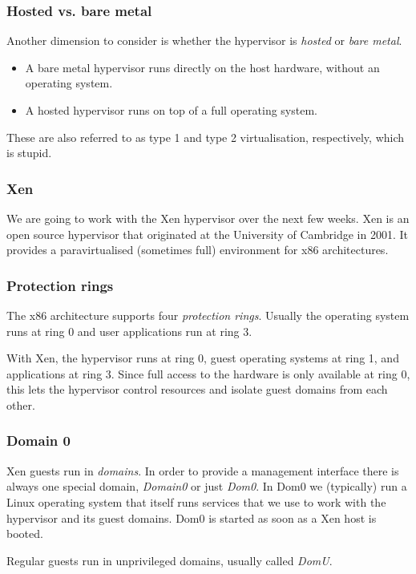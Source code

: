 \documentclass[10pt]{beamer}
\begin{document}
\begin{frame}
  \frametitle{Hosted vs. bare metal}
  
  Another dimension to consider is whether the hypervisor is \emph{hosted} or \emph{bare metal}.
  
  \begin{itemize}
    \item A bare metal hypervisor runs directly on the host hardware, without an operating system.
    \item A hosted hypervisor runs on top of a full operating system.
    \end{itemize}
    
    These are also referred to as type 1 and type 2 virtualisation, respectively, which is stupid.
   
\end{frame}
   
\begin{frame}
  \frametitle{Xen}
   
   We are going to work with the Xen hypervisor over the next few weeks. Xen is an open source hypervisor that originated at the University of Cambridge in 2001. 
   It provides a paravirtualised (sometimes full) environment for x86 architectures.
     
\end{frame}

\begin{frame}
  \frametitle{Protection rings}
   
   The x86 architecture supports four \emph{protection rings}. Usually the operating system runs at ring 0 and user applications run at ring 3. 
   
    \vspace{5mm}
   
   With Xen, the hypervisor 
   runs at ring 0, guest operating systems at ring 1, and applications at ring 3. Since full access to the hardware is only available at ring 0, this lets the hypervisor 
   control resources and isolate guest domains from each other.
           
\end{frame}

\begin{frame}
  \frametitle{Domain 0}
   
  Xen guests run in \emph{domains}. In order to provide a management interface there is always one special domain, \emph{Domain0} or just 
  \emph{Dom0}. In Dom0 we (typically) run a Linux operating system that itself runs services that we use to work with the hypervisor and its guest domains. Dom0 is 
  started as soon as a Xen host is booted.
  
  \vspace{5mm}
  
  Regular guests run in unprivileged domains, usually called \emph{DomU}.
           
\end{frame}
\end{document}
